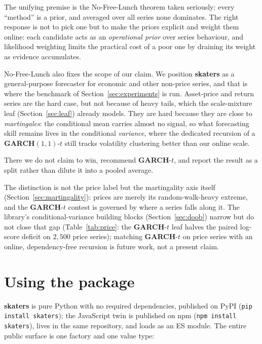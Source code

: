 \documentclass[article]{jss}
\providecommand{\proglang}[1]{\textsf{#1}}
\providecommand{\pkg}[1]{\textbf{#1}}
\providecommand{\code}[1]{\texttt{#1}}
\begin{document}
The unifying premise is the No-Free-Lunch theorem \citep{wolpert1997no} taken
seriously: every ``method'' is a prior, and averaged over all series none
dominates. The right response is not to pick one but to make the priors
explicit and weight them online: each candidate acts as an \emph{operational
prior} over series behaviour, and likelihood weighting limits the practical cost
of a poor one by draining its weight as evidence accumulates.

No-Free-Lunch also fixes the scope of our claim. We position \pkg{skaters} as a
general-purpose forecaster for economic and other non-price series, and that is
where the benchmark of Section~\ref{sec:experiments} is run. Asset-price and
return series are the hard case, but not because of heavy tails, which the
scale-mixture leaf (Section~\ref{sec:leaf}) already models. They are hard because
they are close to \emph{martingales}: the conditional mean carries almost no
signal, so what forecasting skill remains lives in the conditional \emph{variance},
where the dedicated recursion of a \pkg{GARCH}$(1,1)$-$t$ still tracks volatility
clustering better than our online scale.

There we do not claim to win, recommend
\pkg{GARCH}-$t$, and report the result as a split rather than dilute it into a
pooled average.

The distinction is not the price label but the martingality axis
itself (Section~\ref{sec:martingality}): prices are merely its random-walk-heavy
extreme, and the \pkg{GARCH}-$t$ contest is governed by where a series falls along
it. The library's
conditional-variance building blocks (Section~\ref{sec:doob}) narrow but do not
close that gap (Table~\ref{tab:price}: the \pkg{GARCH}-$t$ leaf halves the
paired log-score deficit on $2{,}500$ price series); matching \pkg{GARCH}-$t$ on price series with an online,
dependency-free recursion is future work, not a present claim.

\section{Using the package} \label{sec:software}

\pkg{skaters} is pure \proglang{Python} with no required dependencies,
published on PyPI (\code{pip install skaters}); the \proglang{JavaScript}
twin is published on npm (\code{npm install skaters}), lives in the same
repository, and loads as an ES module. The entire public surface is one factory
and one value type:
\end{document}
